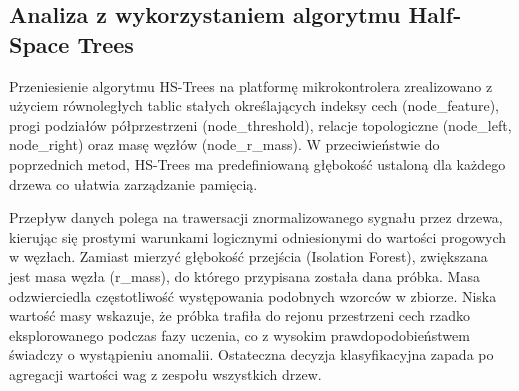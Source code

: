 \documentclass[12pt,twoside]{article}
\begin{document}
\subsection{Analiza z wykorzystaniem algorytmu Half-Space Trees}

Przeniesienie algorytmu HS-Trees na platformę mikrokontrolera zrealizowano z użyciem równoległych tablic stałych określających indeksy cech (node\_feature), progi podziałów półprzestrzeni (node\_threshold), relacje topologiczne (node\_left, node\_right) oraz masę węzłów (node\_r\_mass). W przeciwieństwie do poprzednich metod, HS-Trees ma predefiniowaną głębokość ustaloną dla każdego drzewa co ułatwia zarządzanie pamięcią.

Przepływ danych polega na trawersacji znormalizowanego sygnału przez drzewa, kierując się prostymi warunkami logicznymi odniesionymi do wartości progowych w węzłach. Zamiast mierzyć głębokość przejścia (Isolation Forest), zwiększana jest masa węzła (r\_mass), do którego przypisana została dana próbka. Masa odzwierciedla częstotliwość występowania podobnych wzorców w zbiorze. Niska wartość masy wskazuje, że próbka trafiła do rejonu przestrzeni cech rzadko eksplorowanego podczas fazy uczenia, co z wysokim prawdopodobieństwem świadczy o wystąpieniu anomalii. Ostateczna decyzja klasyfikacyjna zapada po agregacji wartości wag z zespołu wszystkich drzew.
\end{document}
